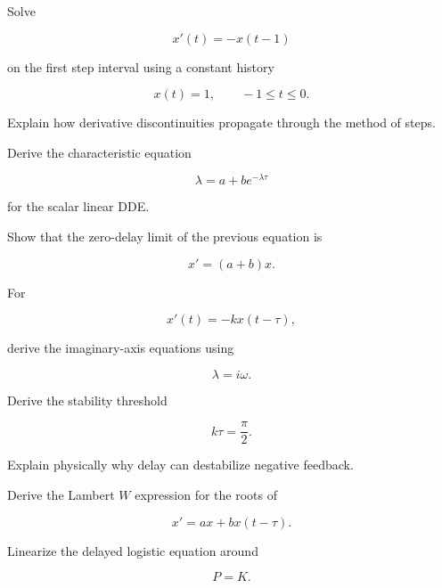 \begin{exercise}[3]
Solve

\[
x'(t)
=
-x(t-1)
\]

on the first step interval using a constant history

\[
x(t)=1,
\qquad
-1\leq t\leq0.
\]
\end{exercise}

\begin{exercise}[3]
Explain how derivative discontinuities propagate through the method of
steps.
\end{exercise}

\begin{exercise}[3]
Derive the characteristic equation

\[
\lambda
=
a
+
be^{-\lambda\tau}
\]

for the scalar linear DDE.
\end{exercise}

\begin{exercise}[3]
Show that the zero-delay limit of the previous equation is

\[
x'=(a+b)x.
\]
\end{exercise}

\begin{exercise}[3]
For

\[
x'(t)
=
-kx(t-\tau),
\]

derive the imaginary-axis equations using

\[
\lambda=i\omega.
\]
\end{exercise}

\begin{exercise}[3]
Derive the stability threshold

\[
k\tau=\frac{\pi}{2}.
\]
\end{exercise}

\begin{exercise}[3]
Explain physically why delay can destabilize negative feedback.
\end{exercise}

\begin{exercise}[3]
Derive the Lambert \(W\) expression for the roots of

\[
x'=ax+bx(t-\tau).
\]
\end{exercise}

\begin{exercise}[3]
Linearize the delayed logistic equation around

\[
P=K.
\]
\end{exercise}

